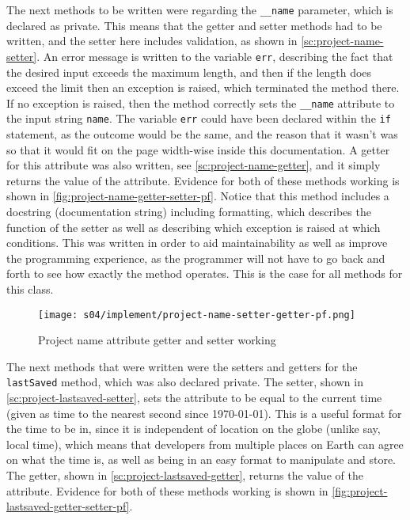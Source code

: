         The next methods to be written were regarding the \verb|__name| parameter, which is declared as private. This means that the getter and setter methods had to be written, and the setter here includes validation, as shown in \autoref{sc:project-name-setter}. 
        An error message is written to the variable \verb|err|, describing the fact that the desired input exceeds the maximum length, and then if the length does exceed the limit then an exception is raised, which terminated the method there. 
        If no exception is raised, then the method correctly sets the \verb|__name| attribute to the input string \verb|name|.
        The variable \verb|err| could have been declared within the \verb|if| statement, as the outcome would be the same, and the reason that it wasn't was so that it would fit on the page width-wise inside this documentation. 
        A getter for this attribute was also written, see \autoref{sc:project-name-getter}, and it simply returns the value of the attribute.
        Evidence for both of these methods working is shown in \autoref{fig:project-name-getter-setter-pf}.
        Notice that this method includes a docstring (documentation string) including formatting, which describes the function of the setter as well as describing which exception is raised at which conditions.
        This was written in order to aid maintainability as well as improve the programming experience, as the programmer will not have to go back and forth to see how exactly the method operates. 
        This is the case for all methods for this class. 

        \begin{figure}[!ht]
            \centering
            \texttt{[image: s04/implement/project-name-setter-getter-pf.png]}
            \caption{Project name attribute getter and setter working}
            \label{fig:project-name-getter-setter-pf}
        \end{figure}

        The next methods that were written were the setters and getters for the \verb|lastSaved| method, which was also declared private. 
        The setter, shown in \autoref{sc:project-lastsaved-setter}, sets the attribute to be equal to the current time (given as time to the nearest second since 1970-01-01). This is a useful format for the time to be in, since it is independent of location on the globe (unlike say, local time), which means that developers from multiple places on Earth can agree on what the time is, as well as being in an easy format to manipulate and store. 
        The getter, shown in \autoref{sc:project-lastsaved-getter}, returns the value of the attribute. 
        Evidence for both of these methods working is shown in \autoref{fig:project-lastsaved-getter-setter-pf}.

